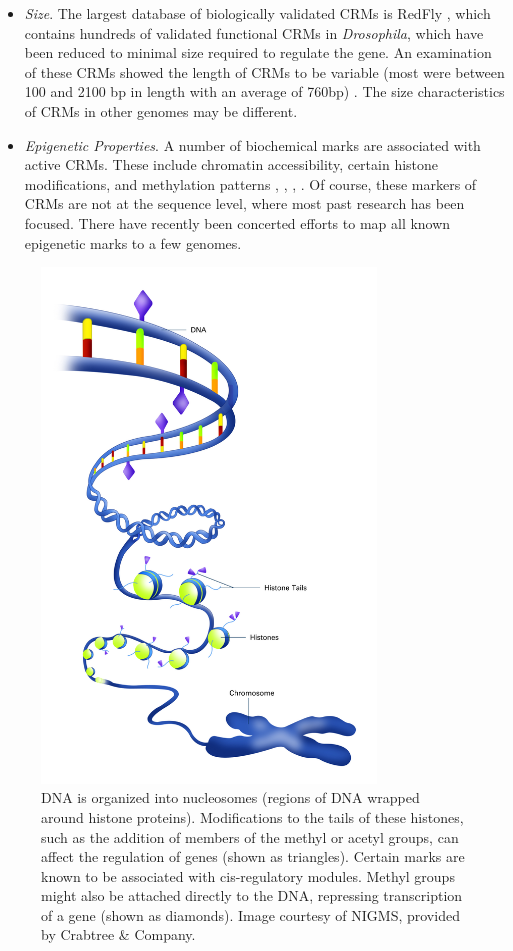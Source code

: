 \documentclass{frontiersENG} %
\begin{document}
\begin{itemize}
\item{\textit{Size}. The largest database of biologically validated
  CRMs is RedFly \cite{Gallo2011}, which contains hundreds of
  validated functional CRMs in \textit{Drosophila}, which have been
  reduced to minimal size required to regulate the gene. An
  examination of these CRMs showed the length of CRMs to be variable
  (most were between 100 and 2100 bp in length with an average of
  760bp) \cite{Li2007}. The size characteristics of CRMs in other
  genomes may be different.}

\item{\textit{Epigenetic Properties}. A number of biochemical marks
  are associated with active CRMs. These include chromatin
  accessibility, certain histone modifications, and methylation
  patterns \cite{Calo2013}, \cite{Bannister2011}, \cite{Encode2011},
  \cite{Cheng2011}. Of course, these markers of CRMs are not at the
  sequence level, where most past research has been focused. There
  have recently been concerted efforts to map all known epigenetic
  marks to a few genomes.}

\end{itemize}

\begin{figure}[ht!]
\centering
  \vspace{-10pt}
  \includegraphics[width=3.5in]{epigenetic.jpg}
  \caption{DNA is organized into nucleosomes (regions of DNA wrapped
    around histone proteins). Modifications to the tails of these
    histones, such as the addition of members of the methyl or acetyl
    groups, can affect the regulation of genes (shown as
    triangles). Certain marks are known to be associated with
    cis-regulatory modules. Methyl groups might also be attached
    directly to the DNA, repressing transcription of a gene (shown as
    diamonds). Image courtesy of NIGMS, provided by Crabtree \&
    Company.}
  \label{fig:epigenetic}
\end{figure}
\end{document}
